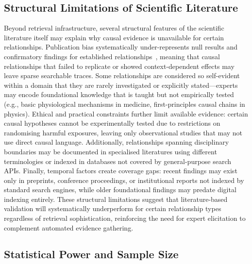 \subsection{Structural Limitations of Scientific Literature}
\label{sec:literature_structural_limitations}

Beyond retrieval infrastructure, several structural features of the scientific literature itself may explain why causal evidence is unavailable for certain relationships. Publication bias systematically under-represents null results and confirmatory findings for established relationships~\citep{dickersin1990existence, rosenthal1979file}, meaning that causal relationships that failed to replicate or showed context-dependent effects may leave sparse searchable traces. Some relationships are considered so self-evident within a domain that they are rarely investigated or explicitly stated---experts may encode foundational knowledge that is taught but not empirically tested (e.g., basic physiological mechanisms in medicine, first-principles causal chains in physics). Ethical and practical constraints further limit available evidence: certain causal hypotheses cannot be experimentally tested due to restrictions on randomising harmful exposures, leaving only observational studies that may not use direct causal language. Additionally, relationships spanning disciplinary boundaries may be documented in specialised literatures using different terminologies or indexed in databases not covered by general-purpose search APIs. Finally, temporal factors create coverage gaps: recent findings may exist only in preprints, conference proceedings, or institutional reports not indexed by standard search engines, while older foundational findings may predate digital indexing entirely. These structural limitations suggest that literature-based validation will systematically underperform for certain relationship types regardless of retrieval sophistication, reinforcing the need for expert elicitation to complement automated evidence gathering.

\subsection{Statistical Power and Sample Size}

